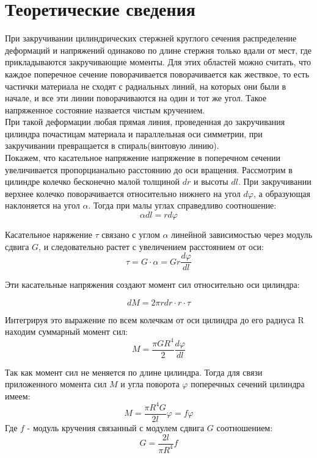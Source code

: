 \documentclass[a4paper,12pt]{article} %
\begin{document}
\section{Теоретические сведения}
При закручивании цилиндрических стержней круглого сечения распределение деформаций
 и напряжений одинаково по длине стержня только вдали от мест, где прикладываются закручивающие моменты.
Для этих областей можно считать, что каждое поперечное сечение поворачивается поворачивается как жествкое,
то есть частички материала не сходят с радиальных линий, на которых они были в начале, и все
эти линии поворачиваются на один и тот же угол. Такое напряженное состояние назвается чистым кручением.\\

При такой деформации любая прямая линия, проведенная до закручивания цилиндра почастицам материала и параллельная оси симметрии,
при закручивании превращается в спираль(винтовую линию). \\

Покажем, что касательное напряжение напряжение в поперечном сечении увеличивается пропорцианально
 расстоянию до оси вращения.
Рассмотрим в цилиндре колечко бесконечно малой толщиной $dr$ и высоты $dl$. При закручивании верхнее колечко поворачивается относительно 
нижнего на угол $d\varphi$, а образующая наклоняется на угол $\alpha$. Тогда при малы углах справедливо соотношение:
\begin{equation}
    \alpha dl= r d\varphi 
\end{equation}

Касательное наряжение $\tau $ связано с углом $\alpha$ линейной зависимостью через модуль сдвига $G$,
 и следовательно растет с увеличением расстоянием от оси:
\begin{equation}
    \tau = G\cdot \alpha =Gr\frac{d\varphi}{dl} 
\end{equation}

Эти касательные напряжения создают момент сил относительно оси цилиндра:

\begin{equation}
    dM=2\pi r dr \cdot r\cdot \tau  
\end{equation}

Интегрируя это выражение по всем колечкам от оси цилиндра до его радиуса R находим суммарный
момент сил:
\begin{equation}
    M = \frac{\pi G R^{4}}{2} \frac{d \varphi }{d l} 
\end{equation}

Так как момент сил не меняется по длине цилиндра. Тогда для связи приложенного
момента сил $M$ и угла поворота $\varphi$ поперечных сечений цилиндра имеем:
\begin{equation}
    M=\frac{\pi R^{4}G}{2l}\varphi=f \varphi
\end{equation}
Где $f$ - модуль кручения связанный с модулем сдвига $G$ соотношением:
\begin{equation}
    G=\frac{2l}{\pi R^{4}}f
\end{equation}
\end{document}
